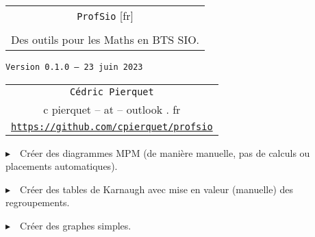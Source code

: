 \documentclass[french,a4paper,11pt]{article}
\def\TPversion{0.1.0}
\def\TPdate{23 juin 2023}
\begin{document}
\setlength{\aweboxleftmargin}{0.07\linewidth}
\setlength{\aweboxcontentwidth}{0.93\linewidth}
\setlength{\aweboxvskip}{8pt}

\pagestyle{fancy}

\thispagestyle{empty}

\vspace{2cm}

\begin{center}
	\begin{minipage}{0.75\linewidth}
	\begin{tcolorbox}[colframe=yellow,colback=yellow!15]
		\begin{center}
			\begin{tabular}{c}
				{\Huge \texttt{ProfSio} [fr]}\\
				\\
				{\LARGE Des outils pour les Maths en BTS SIO.} \\
			\end{tabular}
			
			\bigskip
			
			{\small \texttt{Version \TPversion{} -- \TPdate}}
		\end{center}
	\end{tcolorbox}
\end{minipage}
\end{center}

\begin{center}
	\begin{tabular}{c}
	\texttt{Cédric Pierquet}\\
	{\ttfamily c pierquet -- at -- outlook . fr}\\
	\texttt{\url{https://github.com/cpierquet/profsio}}
\end{tabular}
\end{center}

\vspace{0.25cm}

{$\blacktriangleright$~~Créer des diagrammes MPM (de manière manuelle, pas de calculs ou placements automatiques).}

\vspace{0.25cm}

{$\blacktriangleright$~~Créer des tables de Karnaugh avec mise en valeur (manuelle) des regroupements.}

\vspace{0.25cm}

{$\blacktriangleright$~~Créer des graphes simples.}

\vspace{1cm}
\end{document}
